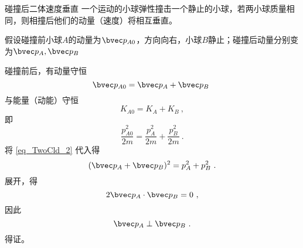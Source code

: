 \begin{example}{碰撞后二体速度垂直}
一个运动的小球弹性撞击一个静止的小球，若两小球质量相同，则相撞后他们的动量（速度）将相互垂直。

假设碰撞前小球$A$的动量为$\bvec p_{A0}$，方向向右，小球$B$静止；碰撞后动量分别变为$\bvec p_{A},\bvec p_{B}$

碰撞前后，有动量守恒
\begin{equation}\label{eq_TwoCld_2}
\bvec p_{A0} = \bvec p_{A} + \bvec p_{B}~
\end{equation}
与能量（动能）守恒
\begin{equation}
K_{A0} = K_{A} + K_{B}~,
\end{equation}
即
\begin{equation}
\frac{p_{A0}^2}{2m}=\frac{p_{A}^2}{2m}+\frac{p_{B}^2}{2m}~.
\end{equation}
将 \autoref{eq_TwoCld_2} 代入得
\begin{equation}
(\bvec p_{A} + \bvec p_{B})^2=p_{A}^2+p_{B}^2~.
\end{equation}
展开，得
\begin{equation}
2\bvec p_{A} \cdot \bvec p_{B}=0~,
\end{equation}
因此
\begin{equation}
\bvec p_{A} \perp \bvec p_{B}~.
\end{equation}
得证。
\end{example}



